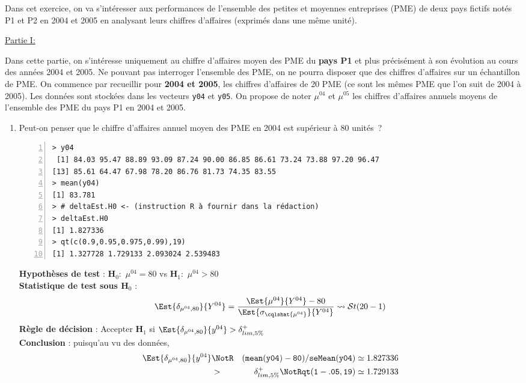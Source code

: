 \documentclass[10pt]{report}
\begin{document}
\begin{exercice}

Dans cet exercice, on va s'intéresser aux performances de l'ensemble des petites et moyennes entreprises (PME) de deux pays fictifs notés P1 et P2 en 2004 et 2005 en analysant leurs chiffres d'affaires (exprimés dans une même unité).

\noindent \underline{Partie I:}

Dans cette partie, on s'intéresse uniquement au chiffre d'affaires moyen des PME du {\bf pays P1} et plus précisément à son évolution au cours des années 2004 et 2005. Ne pouvant pas interroger l'ensemble des PME, on ne pourra disposer que des chiffres d'affaires sur un échantillon de PME. On commence par recueillir pour {\bf 2004 et 2005}, les chiffres d'affaires de 20 PME (ce sont les mêmes PME que l'on suit de 2004 à 2005). Les données sont stockées dans les vecteurs \texttt{y04} et \texttt{y05}. On propose de noter $\mu^{04}$ et $\mu^{05}$ les chiffres d'affaires annuels moyens de l'ensemble des PME du pays P1 en 2004 et 2005. 


\begin{enumerate}
\item Peut-on penser que le chiffre d'affaires annuel moyen des PME en 2004 est supérieur à 80 unités~?

\IndicR
\begin{Verbatim}[frame=leftline,fontfamily=tt,fontshape=n,numbers=left]
> y04
 [1] 84.03 95.47 88.89 93.09 87.24 90.00 86.85 86.61 73.24 73.88 97.20 96.47
[13] 85.61 64.47 67.98 78.20 86.76 81.73 74.35 83.55
> mean(y04)
[1] 83.781
> # deltaEst.H0 <- (instruction R à fournir dans la rédaction)
> deltaEst.H0
[1] 1.827336
> qt(c(0.9,0.95,0.975,0.99),19)
[1] 1.327728 1.729133 2.093024 2.539483
\end{Verbatim}

 

\begin{Correction}

\noindent \textbf{Hypothèses de test} : $\mathbf{H}_0:$ $\mu^{04}=80$ vs {\large $\mathbf{H}_1:$ $\mu^{04}>80$}\\
\textbf{Statistique de test sous $\mathbf{H}_0$} :
  $$
  \Est{\delta_{\mu^{04},80}}{Y^{04}}= {\displaystyle \frac{\Est{\mu^{04}}{Y^{04}}-80}{
\Est{\sigma_{\cqlshat{\mu^{04}}}}{Y^{04}}
}} 
  \leadsto \mathcal{S}t(20-1)
  $$
\textbf{Règle de décision} : Accepter $\mathbf{H}_1$ si 
  $\Est{\delta_{\mu^{04},80}}{y^{04}} > \delta^+_{lim,5\%}$\\
\noindent \textbf{Conclusion} :
puisqu'au vu des données, 
  \begin{eqnarray*}
\Est{\delta_{\mu^{04},80}}{y^{04}} &\NotR&\mathtt{(mean(y04)-80)/seMean(y04)}\simeq 1.827336\\& >  & \delta^+_{lim,5\%} \NotR \mathtt{qt(1-.05,19)}\simeq1.729133
\end{eqnarray*}
  

\end{Correction}
\end{enumerate}
\end{exercice}
\end{document}

